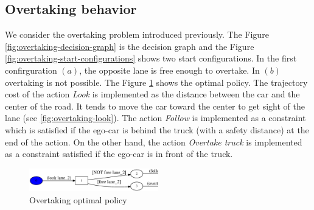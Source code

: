 \documentclass[conference]{IEEEtran}
\begin{document}
\subsection{Overtaking behavior}
We consider the overtaking problem introduced previously. The Figure \ref{fig:overtaking-decision-graph} is the decision graph and the Figure \ref{fig:overtaking-start-configurations} shows two start configurations. In the first confirguration $(a)$, the opposite lane is free enough to overtake. In $(b)$ overtaking is not possible. The Figure \ref{fig:overtaking-policy} shows the optimal policy. The trajectory cost of the action \textit{Look} is implemented as the distance between the car and the center of the road. It tends to move the car toward the center to get sight of the lane (see \ref{fig:overtaking-look}). The action \textit{Follow} is implemented as a constraint which is satisfied if the ego-car is behind the truck (with a safety distance) at the end of the action. On the other hand, the action \textit{Overtake truck} is implemented as a constraint satisfied if the ego-car is in front of the truck.
\begin{figure}[h!]
  \centering
      \includegraphics[width=0.5\textwidth]{data/cars/policy.eps}
  \caption{Overtaking optimal policy}
  \label{fig:overtaking-policy}
\end{figure}
\end{document}
